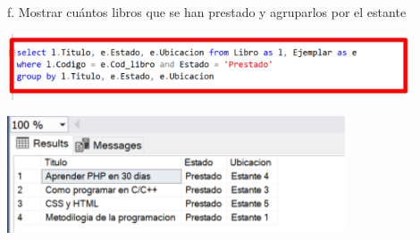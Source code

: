 \documentclass[12pt,letterpaper]{article}
\begin{document}
f. Mostrar cuántos libros que se han prestado y agruparlos por el estante
\begin{center}
    \includegraphics[width=12cm]{img/18.png}  
\end{center}
\begin{center}
    \includegraphics[width=10cm]{img/19.png}  
\end{center}
\end{document}
